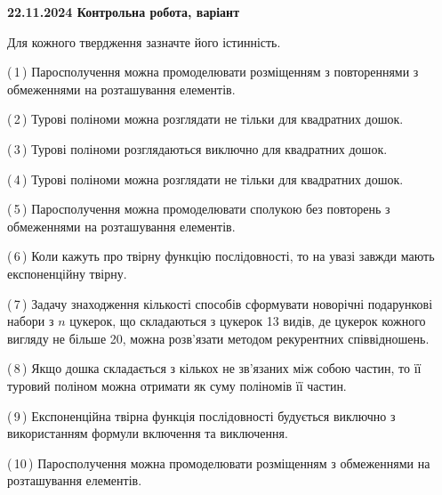 \documentclass[12pt, ukrainian]{article}
\begin{document}
\begin {large}
\begin {large}
\begin {large}

\textbf{22.11.2024 Контрольна робота, варіант  }\par


{
Для кожного твердження зазначте його істинність.\par

\vspace{2mm}

(\,1\,) Паросполучення можна промоделювати розміщенням з повтореннями з обмеженнями на розташування елементів.%



(\,2\,) Турові поліноми можна розглядати не тільки для квадратних дошок.%



(\,3\,) Турові поліноми розглядаються виключно для квадратних дошок.%



(\,4\,) Турові поліноми можна розглядати не тільки для квадратних дошок.%



(\,5\,) Паросполучення можна промоделювати сполукою без повторень з обмеженнями на розташування елементів.%



(\,6\,) Коли кажуть про твірну функцію послідовності, то на увазі завжди мають експоненційну твірну.%



(\,7\,) Задачу знаходження кількості способів сформувати новорічні подарункові набори з $n$ цукерок, що складаються з цукерок 13 видів, де цукерок кожного вигляду не більше 20, можна розв’язати методом рекурентних співвідношень.%



(\,8\,) Якщо дошка складається з кількох не зв’язаних між собою частин, то її туровий поліном можна отримати як суму поліномів її частин.%



(\,9\,) Експоненційна твірна функція послідовності будується виключно з використанням формули включення та виключення.%



(\,10\,) Паросполучення можна промоделювати розміщенням з обмеженнями на розташування елементів.%




\vspace{5mm}
}
\newpage

\begin {large}


\end{large}
\end{large}
\end{large}
\end{large}
\end{document}
